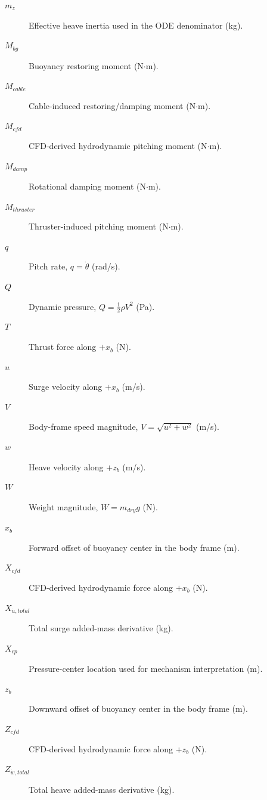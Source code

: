 \begin{description}
\item[$m_z$] Effective heave inertia used in the ODE denominator (kg).
\item[$M_{bg}$] Buoyancy restoring moment (N$\cdot$m).
\item[$M_{cable}$] Cable-induced restoring/damping moment (N$\cdot$m).
\item[$M_{cfd}$] CFD-derived hydrodynamic pitching moment (N$\cdot$m).
\item[$M_{damp}$] Rotational damping moment (N$\cdot$m).
\item[$M_{thruster}$] Thruster-induced pitching moment (N$\cdot$m).
\item[$q$] Pitch rate, $q=\dot{\theta}$ (rad/s).
\item[$Q$] Dynamic pressure, $Q=\tfrac{1}{2}\rho V^2$ (Pa).
\item[$T$] Thrust force along $+x_b$ (N).
\item[$u$] Surge velocity along $+x_b$ (m/s).
\item[$V$] Body-frame speed magnitude, $V=\sqrt{u^2+w^2}$ (m/s).
\item[$w$] Heave velocity along $+z_b$ (m/s).
\item[$W$] Weight magnitude, $W=m_{dry}g$ (N).
\item[$x_b$] Forward offset of buoyancy center in the body frame (m).
\item[$X_{cfd}$] CFD-derived hydrodynamic force along $+x_b$ (N).
\item[$X_{\dot{u},total}$] Total surge added-mass derivative (kg).
\item[$X_{cp}$] Pressure-center location used for mechanism interpretation (m).
\item[$z_b$] Downward offset of buoyancy center in the body frame (m).
\item[$Z_{cfd}$] CFD-derived hydrodynamic force along $+z_b$ (N).
\item[$Z_{\dot{w},total}$] Total heave added-mass derivative (kg).
\end{description}

